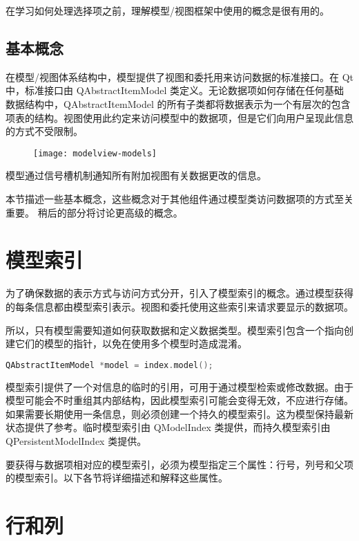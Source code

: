 在学习如何处理选择项之前，理解模型/视图框架中使用的概念是很有用的。

\subsection{基本概念}

在模型/视图体系结构中，模型提供了视图和委托用来访问数据的标准接口。在 Qt 中，标准接口由 QAbstractItemModel 类定义。无论数据项如何存储在任何基础数据结构中，QAbstractItemModel 的所有子类都将数据表示为一个有层次的包含项表的结构。视图使用此约定来访问模型中的数据项，但是它们向用户呈现此信息的方式不受限制。

\begin{figure}[hpt!]  
	\centering
    \texttt{[image: modelview-models]}
\end{figure}

模型通过信号槽机制通知所有附加视图有关数据更改的信息。

本节描述一些基本概念，这些概念对于其他组件通过模型类访问数据项的方式至关重要。 稍后的部分将讨论更高级的概念。

\section{模型索引}

为了确保数据的表示方式与访问方式分开，引入了模型索引的概念。通过模型获得的每条信息都由模型索引表示。视图和委托使用这些索引来请求要显示的数据项。

所以，只有模型需要知道如何获取数据和定义数据类型。模型索引包含一个指向创建它们的模型的指针，以免在使用多个模型时造成混淆。

\begin{lstlisting}[language=C++]
QAbstractItemModel *model = index.model();
\end{lstlisting}

模型索引提供了一个对信息的临时的引用，可用于通过模型检索或修改数据。由于模型可能会不时重组其内部结构，因此模型索引可能会变得无效，不应进行存储。如果需要长期使用一条信息，则必须创建一个持久的模型索引。这为模型保持最新状态提供了参考。临时模型索引由 QModelIndex 类提供，而持久模型索引由 QPersistentModelIndex 类提供。

要获得与数据项相对应的模型索引，必须为模型指定三个属性：行号，列号和父项的模型索引。以下各节将详细描述和解释这些属性。

\section{行和列}

